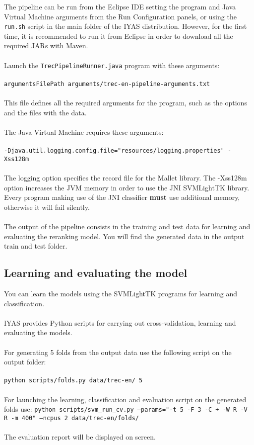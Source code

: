 \documentclass{wileysev}
\begin{document}
The pipeline can be run from the Eclipse IDE setting the program and Java Virtual Machine arguments from the Run Configuration panels, or using the \texttt{run.sh} script in the main folder of the IYAS distribution. However, for the first time, it is recommended to run it from Eclipse in order to download all the required JARs with Maven.
\\\\
Launch the \texttt{TrecPipelineRunner.java} program with these arguments:
\\\\
\texttt{argumentsFilePath arguments/trec-en-pipeline-arguments.txt}
\\\\
This file defines all the required arguments for the program, such as the options and the files with the data.
\\\\
The Java Virtual Machine requires these arguments:
\\\\
\texttt{-Djava.util.logging.config.file="resources/logging.properties" -Xss128m}
\\\\
The logging option specifies the record file for the Mallet library. The -Xss128m option increases the JVM memory in order to use the JNI SVMLightTK library. Every program making use of the JNI classifier \textbf{must} use additional memory, otherwise it will fail silently.
\\\\
The output of the pipeline consists in the training and test data for learning and evaluating the reranking model. You will find the generated data in the output train and test folder.

\subsection{Learning and evaluating the model}
You can learn the models using the SVMLightTK programs for learning and classification.
\\\\
IYAS provides Python scripts for carrying out cross-validation, learning and evaluating the models.
\\\\
For generating 5 folds from the output data use the following script on the output folder:
\\\\
\texttt{python scripts/folds.py data/trec-en/ 5}
\\\\
For launching the learning, classification and evaluation script on the generated folds use:
\texttt{python scripts/svm\_run\_cv.py --params="-t 5 -F 3 -C + -W R -V R -m 400" --ncpus 2 data/trec-en/folds/}
\\\\
The evaluation report will be displayed on screen.
\end{document}
